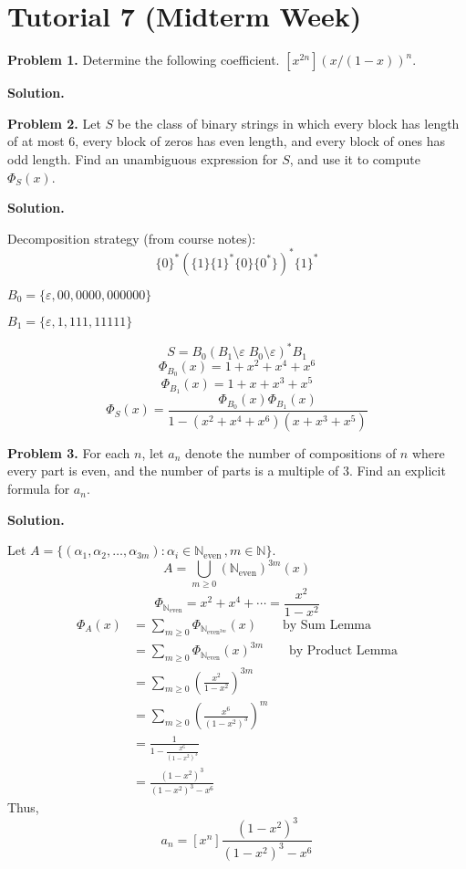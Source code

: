 \section{Tutorial 7 (Midterm Week)}
\textbf{Problem 1.} Determine the following coefficient.
$ [x^{2n}](x/(1-x))^n $.

\textbf{Solution.}

\textbf{Problem 2.} Let $ S $ be the class of binary strings in which every
block has length of at most $ 6 $, every block of zeros has even length,
and every block of ones has odd length. Find an unambiguous expression for $ S $,
and use it to compute $ \Phi_S(x) $.

\textbf{Solution.}

Decomposition strategy (from course notes):
\[ \{0\}^*(\{1\}\{1\}^*\{0\}\{0^*\})^*\{1\}^* \]

$ B_0=\{\varepsilon,00,0000,000000\} $

$ B_1=\{\varepsilon, 1, 111, 11111\} $

\[ S=B_0(B_1\setminus \varepsilon\; B_0\setminus \varepsilon)^* B_1 \]
\[ \Phi_{B_0}(x)=1+x^2+x^4+x^6 \]
\[ \Phi_{B_1}(x)=1+x+x^3+x^5 \]
\[ \Phi_S(x)=\frac{\Phi_{B_0}(x)\Phi_{B_1}(x)}{1-(x^2+x^4+x^6)(x+x^3+x^5)} \]


\textbf{Problem 3.} For each $ n $, let $ a_n $ denote the number of compositions
of $ n $ where every part is even, and the number of parts is a multiple of $ 3 $.
Find an explicit formula for $ a_n $.

\textbf{Solution.}

Let $ A= \{(\alpha_1,\alpha_2,\ldots,\alpha_{3m}):
    \alpha_i\in\mathbb{N}_{\text{even}}\,, m\in\mathbb{N}\} $.
\[ A=\bigcup_{m\geqslant 0}(\mathbb{N}_{\text{even}})^{3m}(x) \]
\[ \Phi_{\mathbb{N}_{\text{even}}}=x^2+x^4+\cdots=\frac{x^2}{1-x^2} \]
\begin{align*}
    \Phi_A(x)
     & =\sum\limits_{m\geqslant 0} \Phi_{\mathbb{N}_{\text{even}^{3m}}}(x)
    \qquad\text{by Sum Lemma}                                              \\
     & =\sum\limits_{m\geqslant 0} \Phi_{\mathbb{N}_{\text{even}}}(x)^{3m}
    \qquad\text{by Product Lemma}                                          \\
     & =\sum\limits_{m\geqslant 0} \left( \frac{x^2}{1-x^2} \right)^{3m}   \\
     & =\sum\limits_{m\geqslant 0} \left( \frac{x^6}{(1-x^2)^3}  \right)^m \\
     & =\frac{1}{1-\frac{x^6}{(1-x^2)^3}}                                  \\
     & =\frac{(1-x^2)^3}{(1-x^2)^3-x^6}
\end{align*}
Thus,
\[ a_n=[x^n]\frac{(1-x^2)^3}{(1-x^2)^3-x^6} \]


